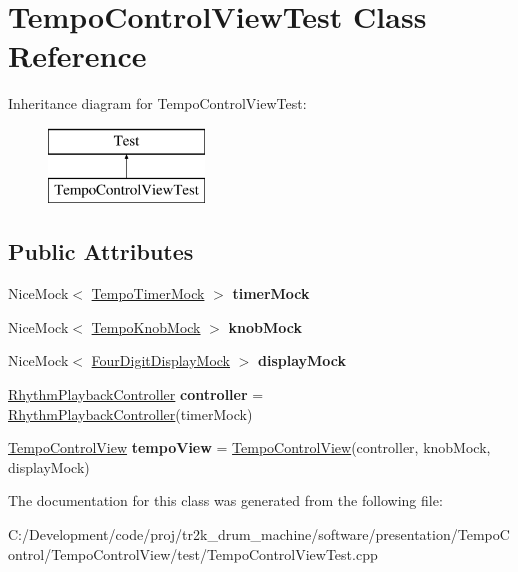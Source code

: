 \hypertarget{class_tempo_control_view_test}{}\section{Tempo\+Control\+View\+Test Class Reference}
\label{class_tempo_control_view_test}
Inheritance diagram for Tempo\+Control\+View\+Test\+:\begin{figure}[H]
\begin{center}
\leavevmode
\includegraphics[height=2.000000cm]{class_tempo_control_view_test}
\end{center}
\end{figure}
\subsection*{Public Attributes}
\begin{DoxyCompactItemize}
\item 
\mbox{\label{class_tempo_control_view_test_a050771720c01d6c11b704d9ad1cff01f}} 
Nice\+Mock$<$ \mbox{\hyperlink{class_tempo_timer_mock}{Tempo\+Timer\+Mock}} $>$ {\bfseries timer\+Mock}
\item 
\mbox{\label{class_tempo_control_view_test_aecfb3b3851d950e21d396c3e4cee47e7}} 
Nice\+Mock$<$ \mbox{\hyperlink{class_tempo_knob_mock}{Tempo\+Knob\+Mock}} $>$ {\bfseries knob\+Mock}
\item 
\mbox{\label{class_tempo_control_view_test_a6af0815cecb1529f78391d9b9cb9dd3d}} 
Nice\+Mock$<$ \mbox{\hyperlink{class_four_digit_display_mock}{Four\+Digit\+Display\+Mock}} $>$ {\bfseries display\+Mock}
\item 
\mbox{\label{class_tempo_control_view_test_aa30375b51fa125e46732b2c16a8c0b6d}} 
\mbox{\hyperlink{class_rhythm_playback_controller}{Rhythm\+Playback\+Controller}} {\bfseries controller} = \mbox{\hyperlink{class_rhythm_playback_controller}{Rhythm\+Playback\+Controller}}(timer\+Mock)
\item 
\mbox{\label{class_tempo_control_view_test_abfb369b29db3a42dca9ef54c4a742714}} 
\mbox{\hyperlink{class_tempo_control_view}{Tempo\+Control\+View}} {\bfseries tempo\+View} = \mbox{\hyperlink{class_tempo_control_view}{Tempo\+Control\+View}}(controller, knob\+Mock, display\+Mock)
\end{DoxyCompactItemize}


The documentation for this class was generated from the following file\+:\begin{DoxyCompactItemize}
\item 
C\+:/\+Development/code/proj/tr2k\+\_\+drum\+\_\+machine/software/presentation/\+Tempo\+Control/\+Tempo\+Control\+View/test/Tempo\+Control\+View\+Test.\+cpp\end{DoxyCompactItemize}
